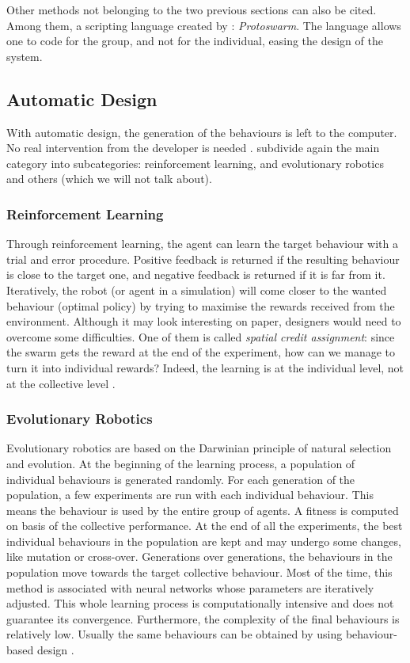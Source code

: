 \documentclass[a4paper, 12pt]{report}
\begin{document}
			Other methods not belonging to the two previous sections can also be cited. Among them, a scripting language created by \citet{bachrach2010composable}: \emph{Protoswarm}. The language allows one to code for the group, and not for the individual, easing the design of the system.
		
		\subsection{Automatic Design}
		
		With automatic design, the generation of the behaviours is left to the computer. No real intervention from the developer is needed \citep{brambilla2013swarm}. \citeauthor{brambilla2013swarm} subdivide again the main category into subcategories: reinforcement learning, and evolutionary robotics and others (which we will not talk about).
		
			\subsubsection{Reinforcement Learning}
			
			Through reinforcement learning, the agent can learn the target behaviour with a trial and error procedure. Positive feedback is returned if the resulting behaviour is close to the target one, and negative feedback is returned if it is far from it. Iteratively, the robot (or agent in a simulation) will come closer to the wanted behaviour (optimal policy) by trying to maximise the rewards received from the environment. Although it may look interesting on paper, designers would need to overcome some difficulties. One of them is called \emph{spatial credit assignment}: since the swarm gets the reward at the end of the experiment, how can we manage to turn it into individual rewards? Indeed, the learning is at the individual level, not at the collective level \citep{wolpert1999introduction}.
			
			\subsubsection{Evolutionary Robotics}
			
			Evolutionary robotics are based on the Darwinian principle of natural selection and evolution. At the beginning of the learning process, a population of individual behaviours is generated randomly. For each generation of the population, a few experiments are run with each individual behaviour. This means the behaviour is used by the entire group of agents. A fitness is computed on basis of the collective performance. At the end of all the experiments, the best individual behaviours in the population are kept and may undergo some changes, like mutation or cross-over. Generations over generations, the behaviours in the population move towards the target collective behaviour. Most of the time, this method is associated with neural networks whose parameters are iteratively adjusted. This whole learning process is computationally intensive and does not guarantee its convergence. Furthermore, the complexity of the final behaviours is relatively low. Usually the same behaviours can be obtained by using behaviour-based design \citep{brambilla2013swarm}.
			
\end{document}
